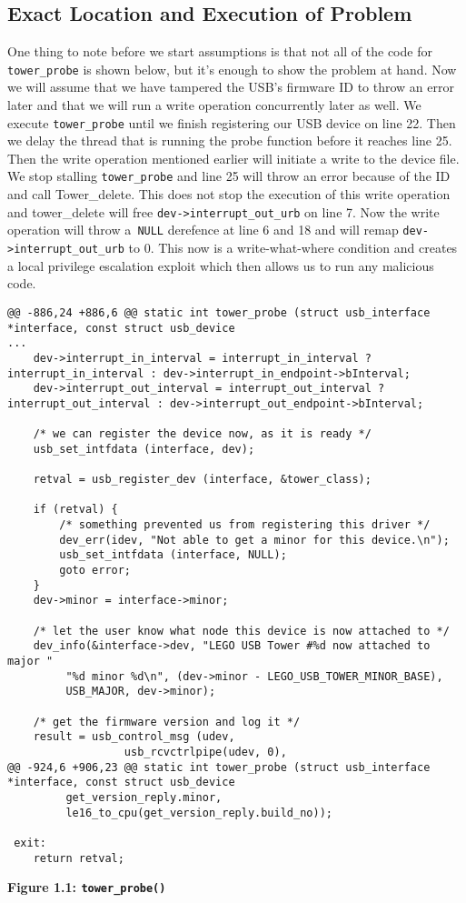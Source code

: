 \documentclass[12pt]{article}
\begin{document}
\subsection{Exact Location and Execution of Problem}
One thing to note before we start assumptions is that not all of the code for \texttt{tower\_probe} is shown below, but it's enough to show the problem at hand. Now we will assume that we have tampered the USB's firmware ID to throw an error later and that we will run a write operation concurrently later as well. We execute \texttt{tower\_probe} until we finish registering our USB device on line 22. Then we delay the thread that is running the probe function before it reaches line 25. Then the write operation mentioned earlier will initiate a write to the device file. We stop stalling \texttt{tower\_probe} and line 25 will throw an error because of the ID and call Tower\_delete. This does not stop the execution of this write operation and tower\_delete will free \texttt{dev->interrupt\_out\_urb} on line 7. Now the write operation will throw a\texttt{ NULL} derefence at line 6 and 18 and will remap \texttt{dev->interrupt\_out\_urb} to 0. This now is a write-what-where condition and creates a local privilege escalation exploit which then allows us to run any malicious code.
\begin{lstlisting}[style=CStyle]
@@ -886,24 +886,6 @@ static int tower_probe (struct usb_interface *interface, const struct usb_device
...
 	dev->interrupt_in_interval = interrupt_in_interval ? interrupt_in_interval : dev->interrupt_in_endpoint->bInterval;
 	dev->interrupt_out_interval = interrupt_out_interval ? interrupt_out_interval : dev->interrupt_out_endpoint->bInterval;
 
	/* we can register the device now, as it is ready */
	usb_set_intfdata (interface, dev);

	retval = usb_register_dev (interface, &tower_class);

	if (retval) {
		/* something prevented us from registering this driver */
		dev_err(idev, "Not able to get a minor for this device.\n");
		usb_set_intfdata (interface, NULL);
		goto error;
	}
	dev->minor = interface->minor;

	/* let the user know what node this device is now attached to */
	dev_info(&interface->dev, "LEGO USB Tower #%d now attached to major "
		 "%d minor %d\n", (dev->minor - LEGO_USB_TOWER_MINOR_BASE),
		 USB_MAJOR, dev->minor);

 	/* get the firmware version and log it */
 	result = usb_control_msg (udev,
 				  usb_rcvctrlpipe(udev, 0),
@@ -924,6 +906,23 @@ static int tower_probe (struct usb_interface *interface, const struct usb_device
 		 get_version_reply.minor,
 		 le16_to_cpu(get_version_reply.build_no));
 
 exit:
 	return retval;
\end{lstlisting}
\centerline{\textbf{Figure 1.1: \texttt{tower\_probe()}}}
\vspace{12pt}
\end{document}
